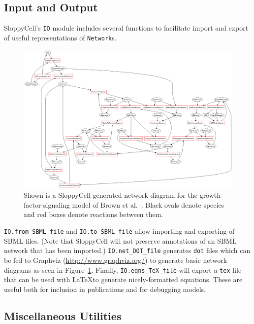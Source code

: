 \documentclass[12pt]{article}
\makeatletter
\newcommand{\py}[1]{\lstinline[language=Python, showstringspaces=False]@#1@}
\newcommand{\shell}[1]{\lstinline[language=csh, showstringspaces=False]!#1!}
\makeatother
\begin{document}
\subsection{Input and Output \label{sec:user:IO}}

SloppyCell's \py{IO} module includes several functions to facilitate import and export of useful representations of \py{Network}s.

\begin{figure}
\begin{center}
\includegraphics[width=\textwidth]{EGFstim100}
\end{center}
\caption[Automatically generated network diagram for G protein model]{Shown is a SloppyCell-generated network diagram for the growth-factor-signaling model of Brown et al.~\cite{bib:Brown2004}. Black ovals denote species and red boxes denote reactions between them.\label{fig:user:dot}}
\end{figure}

\py{IO.from_SBML_file} and \py{IO.to_SBML_file} allow importing and exporting of SBML files. (Note that SloppyCell will not preserve annotations of an SBML network that has been imported.)
\py{IO.net_DOT_file} generates \shell{dot} files which can be fed to Graphviz (\url{http://www.graphviz.org/}) to generate basic network diagrams as seen in Figure~\ref{fig:user:dot}.
Finally, \py{IO.eqns_TeX_file} will export a \shell{tex} file that can be used with \LaTeX to generate nicely-formatted equations. These are useful both for inclusion in publications and for debugging models.

\subsection{Miscellaneous Utilities}
\end{document}
